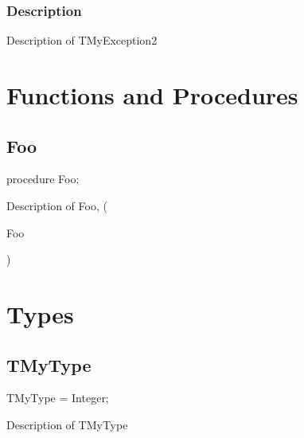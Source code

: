 \documentclass{report}
\begin{document}
\subsubsection*{\large{\textbf{Description}}\normalsize\hspace{1ex}\hfill}
Description of TMyException2\section{Functions and Procedures}
\subsection*{Foo}
\begin{list}{}{
\setlength{\itemindent}{0cm}
\setlength{\listparindent}{0cm}
\setlength{\leftmargin}{\evensidemargin}
\addtolength{\leftmargin}{\tmplength}
\settowidth{\labelsep}{X}
\addtolength{\leftmargin}{\labelsep}
\setlength{\labelwidth}{\tmplength}
}
\begin{flushleft}
\item[\textbf{Declaration}\hfill]
\begin{ttfamily}
procedure Foo;\end{ttfamily}


\end{flushleft}
\par
\item[\textbf{Description}]
Description of Foo, (\begin{ttfamily}Foo\end{ttfamily})

\end{list}
\section{Types}
\subsection*{TMyType}
\begin{list}{}{
\setlength{\itemindent}{0cm}
\setlength{\listparindent}{0cm}
\setlength{\leftmargin}{\evensidemargin}
\addtolength{\leftmargin}{\tmplength}
\settowidth{\labelsep}{X}
\addtolength{\leftmargin}{\labelsep}
\setlength{\labelwidth}{\tmplength}
}
\begin{flushleft}
\item[\textbf{Declaration}\hfill]
\begin{ttfamily}
TMyType = Integer;\end{ttfamily}


\end{flushleft}
\par
\item[\textbf{Description}]
Description of TMyType

\end{list}
\end{document}
